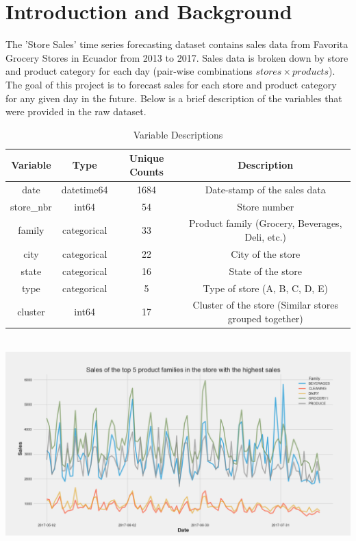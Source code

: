 \documentclass[12pt]{article}
\begin{document}
\section{Introduction and Background}
The 'Store Sales' time series forecasting dataset contains sales data from Favorita Grocery Stores in Ecuador from 2013 to 2017.
Sales data is broken down by store and product category for each day (pair-wise combinations $stores \times products$).
The goal of this project is to forecast sales for each store and product category for any given day in the future.
Below is a brief description of the variables that were provided in the raw dataset.
\begin{table}[h]
\centering
\begin{tabular}{|c|c|c|c|}
\hline
\textbf{Variable} & \textbf{Type} & \textbf{Unique Counts} & \textbf{Description} \\ \hline
date & datetime64 & 1684 & Date-stamp of the sales data \\ \hline
store\_nbr & int64 & 54 & Store number \\ \hline
family & categorical & 33 & Product family (Grocery, Beverages, Deli, etc.) \\ \hline
city & categorical & 22 & City of the store \\ \hline
state & categorical & 16 & State of the store \\ \hline
type & categorical & 5 & Type of store (A, B, C, D, E) \\ \hline
cluster & int64 & 17 & Cluster of the store (Similar stores grouped together) \\ \hline
\end{tabular}
\caption{Variable Descriptions}
\end{table}
\\
\includegraphics[width=\textwidth]{figures/Top 5 Products.png}
\end{document}

